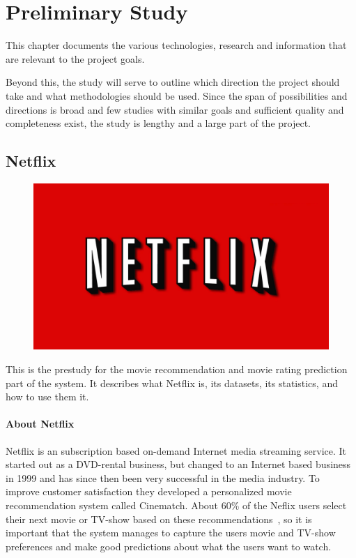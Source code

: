 
\chapter{Preliminary Study}

\minitoc
\noindent
This chapter documents the various technologies, research and information that are relevant to the project goals.

Beyond this, the study will serve to outline which direction the project should take and what methodologies should be used. Since the span of possibilities and directions is broad and few studies with similar goals and sufficient quality and completeness exist, the study is lengthy and a large part of the project.

\clearpage



\section{Netflix}

\begin{figure}
\vspace{-30pt}
\centering
\includegraphics[width = .25\textwidth]{image/netflix-logo.png}
\end{figure}
This is the prestudy for the movie recommendation and movie rating prediction part of the system. It describes what Netflix is, its datasets, its statistics, and how to use them it.

\subsubsection{About Netflix}
Netflix is an subscription based on-demand Internet media streaming service. It started out as a DVD-rental business, but changed to an Internet based business in 1999 and has since then been very successful in the media industry. To improve customer satisfaction they developed a personalized movie recommendation system called Cinematch. About 60\% of the Neflix users select their next movie or TV-show based on these recommendations~\cite{hownetflixworks}, so it is important that the system manages to capture the users movie and TV-show preferences and make good predictions about what the users want to watch.

